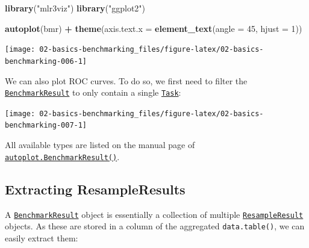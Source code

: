 \documentclass[]{scrbook}
\newenvironment{Shaded}{\begin{snugshade}}{\end{snugshade}}
\newcommand{\DataTypeTok}[1]{\textcolor[rgb]{0.13,0.29,0.53}{#1}}
\newcommand{\DecValTok}[1]{\textcolor[rgb]{0.00,0.00,0.81}{#1}}
\newcommand{\KeywordTok}[1]{\textcolor[rgb]{0.13,0.29,0.53}{\textbf{#1}}}
\newcommand{\NormalTok}[1]{#1}
\newcommand{\OperatorTok}[1]{\textcolor[rgb]{0.81,0.36,0.00}{\textbf{#1}}}
\newcommand{\StringTok}[1]{\textcolor[rgb]{0.31,0.60,0.02}{#1}}
\renewenvironment{Shaded} {\begin{snugshade}\small} {\end{snugshade}}
\begin{document}
\begin{Shaded}
\begin{Highlighting}[]
\KeywordTok{library}\NormalTok{(}\StringTok{"mlr3viz"}\NormalTok{)}
\KeywordTok{library}\NormalTok{(}\StringTok{"ggplot2"}\NormalTok{)}

\KeywordTok{autoplot}\NormalTok{(bmr) }\OperatorTok{+}\StringTok{ }\KeywordTok{theme}\NormalTok{(}\DataTypeTok{axis.text.x =} \KeywordTok{element_text}\NormalTok{(}\DataTypeTok{angle =} \DecValTok{45}\NormalTok{, }\DataTypeTok{hjust =} \DecValTok{1}\NormalTok{))}
\end{Highlighting}
\end{Shaded}

\begin{center}\texttt{[image: 02-basics-benchmarking\_files/figure-latex/02-basics-benchmarking-006-1]} \end{center}

We can also plot ROC curves.
To do so, we first need to filter the \href{https://mlr3.mlr-org.com/reference/BenchmarkResult.html}{\texttt{BenchmarkResult}} to only contain a single \href{https://mlr3.mlr-org.com/reference/Task.html}{\texttt{Task}}:

\begin{Shaded}
\end{Shaded}

\begin{center}\texttt{[image: 02-basics-benchmarking\_files/figure-latex/02-basics-benchmarking-007-1]} \end{center}

All available types are listed on the manual page of \href{https://mlr3viz.mlr-org.com/reference/autoplot.BenchmarkResult.html}{\texttt{autoplot.BenchmarkResult()}}.

\hypertarget{bm-resamp}{%
\subsection{Extracting ResampleResults}\label{bm-resamp}}

A \href{https://mlr3.mlr-org.com/reference/BenchmarkResult.html}{\texttt{BenchmarkResult}} object is essentially a collection of multiple \href{https://mlr3.mlr-org.com/reference/ResampleResult.html}{\texttt{ResampleResult}} objects.
As these are stored in a column of the aggregated \texttt{data.table()}, we can easily extract them:
\end{document}
